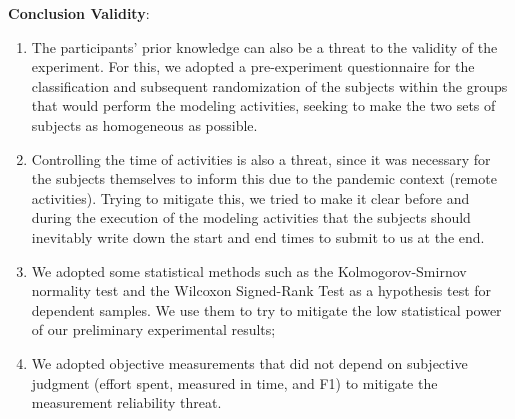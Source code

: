 \textbf{Conclusion Validity}: 
\begin{enumerate} [label=\roman*.]
    \item The participants' prior knowledge can also be a threat to the validity of the experiment. 
    For this, we adopted a pre-experiment questionnaire for the classification and subsequent randomization of the subjects within the groups that would perform the modeling activities, seeking to make the two sets of subjects as homogeneous as possible.
    \item Controlling the time of activities is also a threat, since it was necessary for the subjects themselves to inform this due to the pandemic context (remote activities).
    Trying to mitigate this, we tried to make it clear before and during the execution of the modeling activities that the subjects should inevitably write down the start and end times to submit to us at the end.
    \item We adopted some statistical methods such as the Kolmogorov-Smirnov normality test and the Wilcoxon Signed-Rank Test as a hypothesis test for dependent samples. We use them to try to mitigate the low statistical power of our preliminary experimental results;
    \item We adopted objective measurements that did not depend on subjective judgment (effort spent, measured in time, and F1) to mitigate the measurement reliability threat.

\end{enumerate}
